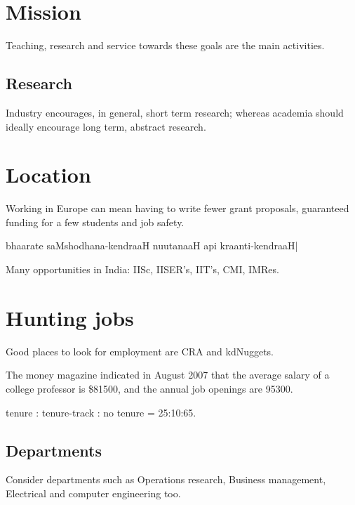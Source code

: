 \documentclass[oneside, article]{memoir}
\begin{document}
\section{Mission}
Teaching, research and service towards these goals are the main activities.

\subsection{Research}
Industry encourages, in general, short term research; whereas academia should ideally encourage long term, abstract research.

\section{Location}
Working in Europe can mean having to write fewer grant proposals, guaranteed funding for a few students and job safety.

bhaarate saMshodhana-kendraaH nuutanaaH api kraanti-kendraaH|

Many opportunities in India: IISc, IISER's, IIT's, CMI, IMRes.

\section{Hunting jobs}
Good places to look for employment are CRA and kdNuggets.

The money magazine indicated in August 2007 that the average salary of a college professor is \$81500, and the annual job openings are 95300.

tenure : tenure-track : no tenure = 25:10:65.

\subsection{Departments}
Consider departments such as Operations research, Business management, Electrical and computer engineering too.
\end{document}
